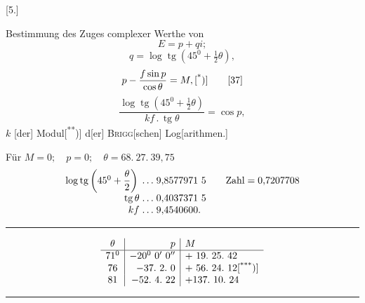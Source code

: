 \clearpage{}
\begingroup\makeatletter\let\veqno\@@leqno\makeatother
{}\par
\begin{center}[5.]\end{center}
\noindent\hspace*{\parindent}Bestimmung des Zuges complexer Werthe von
\[E=p+qi;\]
\begin{equation}q=\log\operatorname{tg}(45^0+\tfrac12\theta),\tag*{[36]}\end{equation}
\noindent [für reelle Werte von \(M=E-f\sin E,\)]
\begin{equation}p-\frac{f\sin p}{\cos\theta}=M,\text{[\textsuperscript{*})]}\tag*{[37]}\end{equation}
\begin{equation}\frac{\log\operatorname{tg}(45^0+\tfrac12\theta)}{kf\,{.}\,\operatorname{tg}\theta}=\cos p,\tag*{[38]}\end{equation}
\noindent \(k\) [der] Modul[\textsuperscript{**})] d[er] \textsc{Brigg}[schen] Log[arithmen.]
\par\noindent\hspace*{\parindent}Für \(M=0;\quad p=0;\quad\theta=68.\ 27.\ 39{,}75\)
\[\begin{array}{r@{\;}l@{\qquad}l}
\log\operatorname{tg}\left(45^0+\dfrac\theta2\right)\;{.}\,{.}\,{.}&9{,}8577971\ 5&\text{Zahl}=0{,}7207708\\[4pt]
\operatorname{tg}\theta\;{.}\,{.}\,{.}&0{,}4037371\ 5&\\
kf\;{.}\,{.}\,{.}&9{,}4540600.&
\end{array}\]
\begin{center}\rule{.24\linewidth}{.4pt}\end{center}
\begingroup\setlength{\arraycolsep}{8pt}\renewcommand{\arraystretch}{1.2}
\[\begin{array}{c|r|l}
\theta&p&M\\\hline
71^0&-20^0\ 0'\ 0''&+\ 19.\ 25.\ 42\\
76&-37.\ 2.\ 0&+\ 56.\ 24.\ 12\text{[\textsuperscript{***})]}\\
81&-52.\ 4.\ 22&+137.\ 10.\ 24
\end{array}\]
\endgroup
\par\vfill\noindent\rule{.25\linewidth}{.4pt}\par\smallskip
